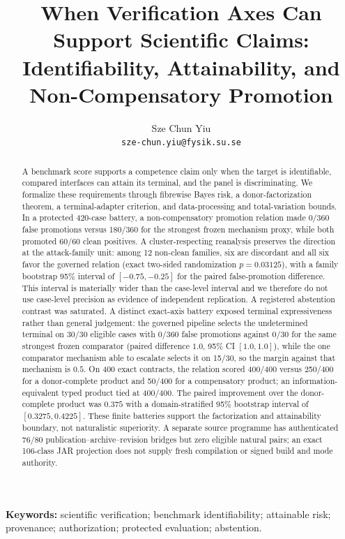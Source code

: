 \documentclass[11pt]{article}
\title{When Verification Axes Can Support Scientific Claims:\\
Identifiability, Attainability, and Non-Compensatory Promotion}
\author{Sze Chun Yiu\\\texttt{sze-chun.yiu@fysik.su.se}}
\date{}
\begin{document}
\maketitle

\begin{abstract}
A benchmark score supports a competence claim only when the target is
identifiable, compared interfaces can attain its terminal, and the panel is
discriminating. We formalize these requirements through fibrewise Bayes risk,
a donor-factorization theorem, a terminal-adapter criterion, and
data-processing and total-variation bounds. In a protected 420-case battery,
a non-compensatory promotion relation made 0/360 false promotions versus
180/360 for the strongest frozen mechanism proxy, while both promoted 60/60
clean positives. A cluster-respecting reanalysis preserves the direction at
the attack-family unit: among 12 non-clean families, six are discordant and all
six favor the governed relation (exact two-sided randomization $p=0.03125$),
with a family bootstrap 95\% interval of $[-0.75,-0.25]$ for the paired
false-promotion difference. This interval is materially wider than the
case-level interval and we therefore do not use case-level precision as evidence
of independent replication. A registered abstention contrast was saturated.
A distinct exact-axis battery exposed terminal expressiveness rather than general
judgement: the governed pipeline selects the undetermined terminal on 30/30
eligible cases with 0/360 false promotions against 0/30 for the same strongest
frozen comparator (paired difference $1.0$, 95\% CI $[1.0,1.0]$), while the one
comparator mechanism able to escalate selects it on 15/30, so the margin
against that mechanism is $0.5$. On 400 exact contracts, the relation scored
400/400 versus 250/400 for a donor-complete product and 50/400 for a
compensatory product; an information-equivalent typed product tied at 400/400.
The paired improvement over the donor-complete product was $0.375$ with a
domain-stratified 95\% bootstrap interval of $[0.3275,0.4225]$. These finite
batteries support the factorization and attainability boundary, not naturalistic
superiority. A separate source programme has authenticated 76/80
publication--archive--revision bridges but zero eligible natural pairs; an exact
106-class JAR projection does not supply fresh compilation or signed build and
mode authority.
\end{abstract}

\noindent\textbf{Keywords:} scientific verification; benchmark identifiability; attainable risk; provenance; authorization; protected evaluation; abstention.
\end{document}
